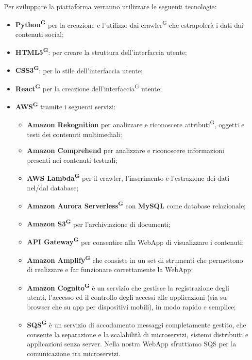 Per sviluppare la piattaforma verranno utilizzare le seguenti tecnologie:
\begin{itemize}
    \item \textbf{Python\textsuperscript{G}} per la creazione e l'utilizzo dai crawler\textsuperscript{G} che estrapolerà i dati dai contenuti social;
    \item \textbf{HTML5\textsuperscript{G}}: per creare la struttura dell'interfaccia utente;
    \item \textbf{CSS3\textsuperscript{G}}: per lo stile dell'interfaccia utente;
    \item \textbf{React\textsuperscript{G}} per la creazione dell'interfaccia\textsuperscript{G} utente;
    \item \textbf{AWS\textsuperscript{G}} tramite i seguenti servizi:
    \begin{itemize}
    	\item \textbf{Amazon Rekognition} per analizzare e riconoscere attributi\textsuperscript{G}{}, oggetti e testi dei contenuti multimediali;
    	\item \textbf{Amazon Comprehend} per analizzare e riconoscere informazioni presenti nei contenuti testuali;
    	\item \textbf{AWS Lambda\textsuperscript{G}} per il crawler, l'inserimento e l'estrazione dei dati nel/dal database;
    	\item \textbf{Amazon Aurora Serverless\textsuperscript{G}} con \textbf{MySQL} come database relazionale;
    	\item \textbf{Amazon S3\textsuperscript{G}} per l'archiviazione di documenti;
    	\item \textbf{API Gateway\textsuperscript{G}} per consentire alla WebApp di visualizzare i contenuti;
    	\item \textbf{Amazon Amplify\textsuperscript{G}} che consiste in un set di strumenti che permettono di realizzare e far funzionare correttamente la WebApp;
    	\item \textbf{Amazon Cognito\textsuperscript{G}} è un servizio che gestisce la registrazione degli utenti, l'accesso ed il controllo degli accessi alle applicazioni (sia su browser che su app per dispositivi mobili), in modo rapido e semplice;
    	\item \textbf{SQS\textsuperscript{G}} è un servizio di accodamento messaggi completamente gestito, che consente la separazione e la scalabilità di microservizi, sistemi distribuiti e applicazioni senza server. Nella nostra WebApp sfruttiamo SQS per la comunicazione tra microservizi.
	\end{itemize}
  \end{itemize}